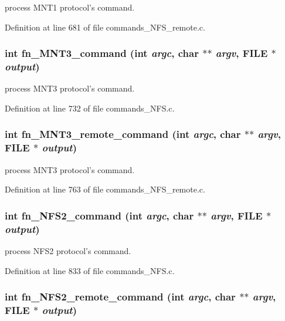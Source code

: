 process MNT1 protocol's command. 

Definition at line 681 of file commands\_\-NFS\_\-remote.c.
\subsubsection[{fn\_\-MNT3\_\-command}]{\setlength{\rightskip}{0pt plus 5cm}int fn\_\-MNT3\_\-command (int {\em argc}, \/  char $\ast$$\ast$ {\em argv}, \/  FILE $\ast$ {\em output})}\label{commands_8h_fcb010876c8c82ba28498eff4e33466a}


process MNT3 protocol's command. 

Definition at line 732 of file commands\_\-NFS.c.
\subsubsection[{fn\_\-MNT3\_\-remote\_\-command}]{\setlength{\rightskip}{0pt plus 5cm}int fn\_\-MNT3\_\-remote\_\-command (int {\em argc}, \/  char $\ast$$\ast$ {\em argv}, \/  FILE $\ast$ {\em output})}\label{commands_8h_7d8f2c4570bef1373bc94247b00a753e}


process MNT3 protocol's command. 

Definition at line 763 of file commands\_\-NFS\_\-remote.c.
\subsubsection[{fn\_\-NFS2\_\-command}]{\setlength{\rightskip}{0pt plus 5cm}int fn\_\-NFS2\_\-command (int {\em argc}, \/  char $\ast$$\ast$ {\em argv}, \/  FILE $\ast$ {\em output})}\label{commands_8h_684fcaaca8949d8362e3b4d23fa1821c}


process NFS2 protocol's command. 

Definition at line 833 of file commands\_\-NFS.c.
\subsubsection[{fn\_\-NFS2\_\-remote\_\-command}]{\setlength{\rightskip}{0pt plus 5cm}int fn\_\-NFS2\_\-remote\_\-command (int {\em argc}, \/  char $\ast$$\ast$ {\em argv}, \/  FILE $\ast$ {\em output})}\label{commands_8h_53ac76af43fede3f2e559a1b4fbb136f}


